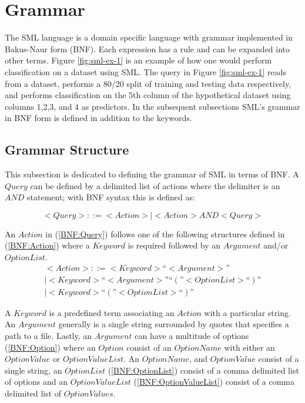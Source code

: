 \documentclass[jair,twoside,11pt,theapa]{article}
\begin{document}
\section{Grammar}
\label{grammar}

The SML language is a domain specific language with grammar implemented in Bakus-Naur form (BNF). Each expression has a rule and can be expanded into other terms. Figure \ref{fig:sml-ex-1} is an example of how one would perform classification on a dataset using SML. The query in Figure \ref{fig:sml-ex-1} reads from a dataset, performs a 80/20 split of training and testing data respectively, and performs classification on the 5th column of the hypothetical dataset using columns 1,2,3, and 4 as predictors. In the subsequent subsections SML's grammar in BNF form is defined in addition to the keywords.

\subsection{Grammar Structure}
This subsection is dedicated to defining the grammar of SML in terms of BNF. A \(Query\) can be defined by a delimited list of actions where the delimiter is an \(AND\) statement; with BNF syntax this is defined as:

\begin{equation} \label{BNF:Query}
<Query> ::= <Action> | <Action> AND <Query>
\end{equation}

An \(Action\) in (\ref{BNF:Query}) follows one of the following structures defined in (\ref{BNF:Action}) where a \(Keyword\) is required followed by an \(Argument\) and/or \(OptionList\).
\begin{equation} \label{BNF:Action}
\begin{split}
<Action> ::= <Keyword> “<Argument>” \\
| <Keyword> “<Argument>” “(”<Option List>“)” \\
| <Keyword> “(”<Option List>“)”
\end{split}
\end{equation}

A \(Keyword\) is a predefined term associating an \(Action\) with a particular string. An \(Argument\) generally is a single string surrounded by quotes that specifies a path to a file. Lastly, an \(Argument\) can have a multitude of options (\ref{BNF:Option}) where an \(Option\) consist of an \(OptionName\) with either an \(OptionValue\) or \(OptionValueList\). An \(OptionName\), and \(OptionValue\) consist of a single string, an \(OptionList\) (\ref{BNF:OptionList}) consist of a comma delimited list of options and an \(OptionValueList\) (\ref{BNF:OptionValueList}) consist of a comma delimited list of \(OptionValues\).
\end{document}

